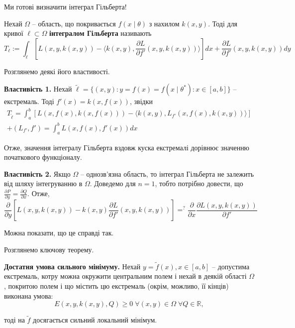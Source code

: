 \documentclass[14pt]{extarticle}
\newcommand{\<}{\langle}
\renewcommand{\>}{\rangle}
\theoremstyle{mystyle}{\newtheorem{definition}{Definition}[section]}
\theoremstyle{mystyle}{\newtheorem{proposition}[definition]{Proposition}}
\theoremstyle{mystyle}{\newtheorem{theorem}[definition]{Theorem}}
\theoremstyle{mystyle}{\newtheorem{lemma}[definition]{Lemma}}
\theoremstyle{mystyle}{\newtheorem{corollary}[definition]{Corollary}}
\theoremstyle{mystyle}{\newtheorem*{remark}{Remark}}
\theoremstyle{mystyle}{\newtheorem*{remarks}{Remarks}}
\theoremstyle{mystyle}{\newtheorem*{example}{Example}}
\theoremstyle{mystyle}{\newtheorem*{examples}{Examples}}
\theoremstyle{definition}{\newtheorem*{exercise}{Exercise}}
\theoremstyle{cstyle}{\newtheorem*{cthm}{}}
\theoremstyle{warn}
\begin{document}
Ми готові визначити інтеграл Гільберта!

\begin{definition}
    Нехай $\Omega$ -- область, що покривається $f(x\mid\theta)$ з нахилом $k(x,y)$. Тоді для кривої $\ell \subset \Omega$ \textbf{інтегралом Гільберта} називають
    \begin{equation}
        T_{\ell} := \int_{\ell} \left[L(x,y,k(x,y))-\langle k(x,y), \frac{\partial L}{\partial f'}(x,y,k(x,y))\rangle\right]dx + \frac{\partial L}{\partial f'}(x,y,k(x,y))dy
    \end{equation}
\end{definition}

Розглянемо деякі його властивості.

\textbf{Властивість 1.} Нехай $\widetilde{\ell}=\{(x,y): y=f(x)=f(x\mid\theta^*): x \in [a,b]\}$ -- екстремаль. Тоді $f'(x)=k(x,f(x))$, звідки
\begin{gather}
    T_{\widetilde{\ell}} = \int_a^b [L(x,f(x),k(x,f(x))) - \langle k(x,y),L_{f'}(x,f(x),k(x,y)) \rangle] \\ + (L_{f'},f') = \int_a^b L(x,f(x),f'(x))dx
\end{gather}

Отже, значення інтегралу Гільберта вздовж куска екстремалі дорівнює значенню початкового функціоналу.

\textbf{Властивість 2.} Якщо $\Omega$ -- однозв'язна область, то інтеграл Гільберта не залежить від шляху інтегруванню в $\Omega$. Доведемо для $n=1$, тобто потрібно довести, що $\frac{\partial P}{\partial y}=\frac{\partial Q}{\partial x}$. Отже,
\begin{equation}
    \frac{\partial}{\partial y}\left[L(x,y,k(x,y))-k(x,y)\frac{\partial L}{\partial f'}(x,y,k(x,y))\right] =^? \frac{\partial}{\partial x} \frac{\partial L(x,y,k(x,y))}{\partial f'}
\end{equation}

Можна показати, що це справді так.

Розглянемо ключову теорему.

\begin{theorem}
    \textbf{Достатня умова сильного мінімуму.} Нехай $y=\widetilde{f}(x),x\in[a,b]$ -- допустима екстремаль, котру можна окружити центральним полем і нехай в деякій області $\Omega$, покритою полем і що містить цю екстремаль (окрім, можливо, її кінців)
    виконана умова:
    \begin{equation}
        E(x,y,k(x,y),Q) \geq 0 \; \forall (x,y) \in \Omega \; \forall Q \in \mathbb{R},
    \end{equation}

    тоді на $\widetilde{f}$ досягається сильний локальний мінімум.
\end{theorem}
\end{document}
